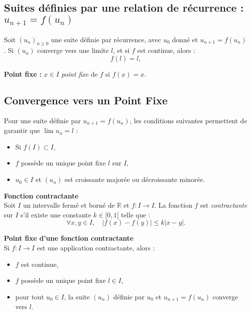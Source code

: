 \documentclass[a4paper,10pt]{article}
\begin{document}
\subsection*{Suites définies par une relation de récurrence : \( u_{n+1} = f(u_n) \)}
Soit \( (u_n)_{n \geq 0} \) une suite définie par récurrence, avec \( u_0 \) donné et \( u_{n+1} = f(u_n) \). Si \( (u_n) \) converge vers une limite \( l \), et si \( f \) est continue, alors :
\[
f(l) = l,
\]

\textbf{Point fixe : }
\( x \in I \) \emph{point fixe} de \( f \) si \( f(x) = x \).

\subsection*{Convergence vers un Point Fixe}
Pour une suite définie par \( u_{n+1} = f(u_n) \), les conditions suivantes permettent de garantir que \( \lim u_n = l \) :
\begin{itemize}
	\item Si \( f(I) \subset I \),
	\item \( f \) possède un unique point fixe \( l \) sur \( I \),
	\item \( u_0 \in I \) et \( (u_n) \) est croissante majorée ou décroissante minorée.
\end{itemize}

\textbf{Fonction contractante} \\
Soit \( I \) un intervalle fermé et borné de \( \mathbb{R} \) et \( f : I \to I \). La fonction \( f \) est \emph{contractante} sur \( I \) s'il existe une constante \( k \in [0, 1[ \) telle que :
\[
\forall x, y \in I, \quad |f(x) - f(y)| \leq k |x - y|.
\]

\textbf{Point fixe d'une fonction contractante} \\
Si \( f : I \to I \) est une application contractante, alors :
\begin{itemize}
	\item \( f \) est continue,
	\item \( f \) possède un unique point fixe \( l \in I \),
	\item pour tout \( u_0 \in I \), la suite \( (u_n) \) définie par \( u_0 \) et \( u_{n+1} = f(u_n) \) converge vers \( l \).
\end{itemize}
\end{document}
